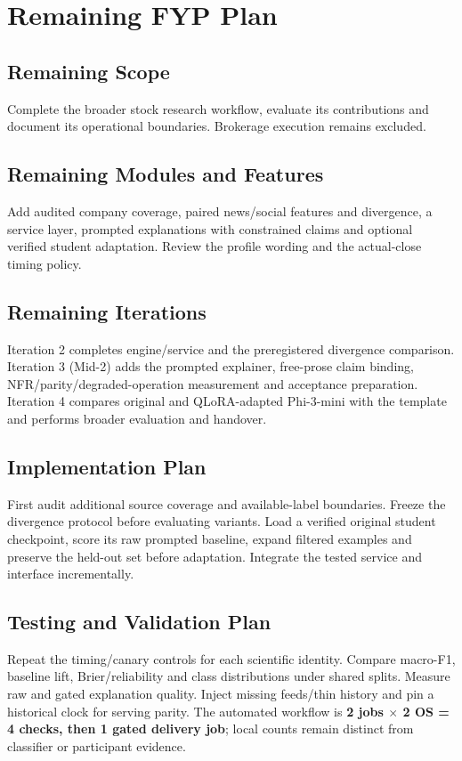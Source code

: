 \chapter{Remaining FYP Plan}
\section{Remaining Scope}
Complete the broader stock research workflow, evaluate its contributions and document its operational boundaries. Brokerage execution remains excluded.
\section{Remaining Modules and Features}
Add audited company coverage, paired news/social features and divergence, a service layer, prompted explanations with constrained claims and optional verified student adaptation. Review the profile wording and the actual-close timing policy.
\section{Remaining Iterations}
Iteration 2 completes engine/service and the preregistered divergence comparison. Iteration 3 (Mid-2) adds the prompted explainer, free-prose claim binding, NFR/parity/degraded-operation measurement and acceptance preparation. Iteration 4 compares original and QLoRA-adapted Phi-3-mini with the template and performs broader evaluation and handover.
\section{Implementation Plan}
First audit additional source coverage and available-label boundaries. Freeze the divergence protocol before evaluating variants. Load a verified original student checkpoint, score its raw prompted baseline, expand filtered examples and preserve the held-out set before adaptation. Integrate the tested service and interface incrementally.
\section{Testing and Validation Plan}
Repeat the timing/canary controls for each scientific identity. Compare macro-F1, baseline lift, Brier/reliability and class distributions under shared splits. Measure raw and gated explanation quality. Inject missing feeds/thin history and pin a historical clock for serving parity. The automated workflow is \textbf{2 jobs $\times$ 2 OS = 4 checks, then 1 gated delivery job}; local counts remain distinct from classifier or participant evidence.
